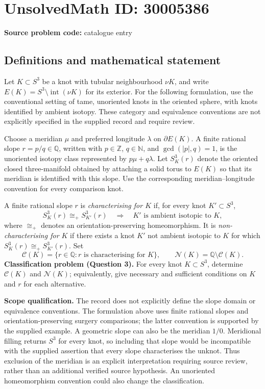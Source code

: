 \documentclass[11pt]{article}
\newcommand{\N}{\mathbb{N}}
\newcommand{\Z}{\mathbb{Z}}
\newcommand{\Q}{\mathbb{Q}}
\begin{document}
\section*{UnsolvedMath ID: 30005386}
\textbf{Source problem code:} catalogue entry
\subsection{Definitions and mathematical statement}
Let \(K\subset S^3\) be a knot with tubular neighbourhood \(\nu K\), and write \(E(K)=S^3\setminus\operatorname{int}(\nu K)\) for its exterior. For the following formulation, use the conventional setting of tame, unoriented knots in the oriented sphere, with knots identified by ambient isotopy. These category and equivalence conventions are not explicitly specified in the supplied record and require review.

Choose a meridian \(\mu\) and preferred longitude \(\lambda\) on \(\partial E(K)\). A finite rational slope \(r=p/q\in\Q\), written with \(p\in\Z\), \(q\in\N\), and \(\gcd(|p|,q)=1\), is the unoriented isotopy class represented by \(p\mu+q\lambda\). Let \(S^3_K(r)\) denote the oriented closed three-manifold obtained by attaching a solid torus to \(E(K)\) so that its meridian is identified with this slope. Use the corresponding meridian--longitude convention for every comparison knot.

A finite rational slope \(r\) is \emph{characterising for \(K\)} if, for every knot \(K'\subset S^3\),
\[
S^3_K(r)\cong_{+}S^3_{K'}(r)
\quad\Longrightarrow\quad
K'\text{ is ambient isotopic to }K,
\]
where \(\cong_{+}\) denotes an orientation-preserving homeomorphism. It is \emph{non-characterising for \(K\)} if there exists a knot \(K'\) not ambient isotopic to \(K\) for which \(S^3_K(r)\cong_{+}S^3_{K'}(r)\). Set
\[
\mathcal C(K)=\{r\in\Q:r\text{ is characterising for }K\},
\qquad
\mathcal N(K)=\Q\setminus\mathcal C(K).
\]
\textbf{Classification problem (Question 3).} For every knot \(K\subset S^3\), determine \(\mathcal C(K)\) and \(\mathcal N(K)\); equivalently, give necessary and sufficient conditions on \(K\) and \(r\) for each alternative.

\textbf{Scope qualification.} The record does not explicitly define the slope domain or equivalence conventions. The formulation above uses finite rational slopes and orientation-preserving surgery comparisons; the latter convention is supported by the supplied example. A geometric slope can also be the meridian \(1/0\). Meridional filling returns \(S^3\) for every knot, so including that slope would be incompatible with the supplied assertion that every slope characterises the unknot. Thus exclusion of the meridian is an explicit interpretation requiring source review, rather than an additional verified source hypothesis. An unoriented homeomorphism convention could also change the classification.
\end{document}
